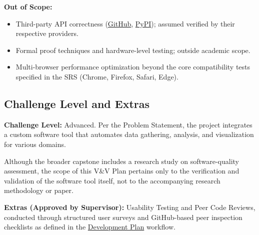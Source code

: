 \documentclass[12pt, titlepage]{article}
\begin{document}
\textbf{Out of Scope:}
\begin{itemize}
  \item Third-party API correctness (\href{https://docs.github.com/en}{GitHub}, \href{https://pypi.org/}{PyPI}); assumed verified by their
  respective providers.

  \item Formal proof techniques and hardware-level testing; outside academic
  scope.

  \item Multi-browser performance optimization beyond the core compatibility
  tests specified in the SRS (Chrome, Firefox, Safari, Edge).
\end{itemize}

\subsection{Challenge Level and Extras}
\label{subsec:challenge-level}

\textbf{Challenge Level:} Advanced. Per the Problem Statement, the project
integrates a custom software tool that automates data gathering, analysis, and
visualization for various domains.

Although the broader capstone includes a research study on software-quality
assessment, the scope of this V\&V Plan pertains only to the verification and
validation of the software tool itself, not to the accompanying research
methodology or paper.


\textbf{Extras (Approved by Supervisor):} Usability Testing and Peer Code
Reviews, conducted through structured user surveys and GitHub-based peer
inspection checklists as defined in the \href{https://github.com/thaafei/DomainX/blob/main/docs/DevelopmentPlan/DevelopmentPlan.pdf}{Development Plan} workflow.
\end{document}
